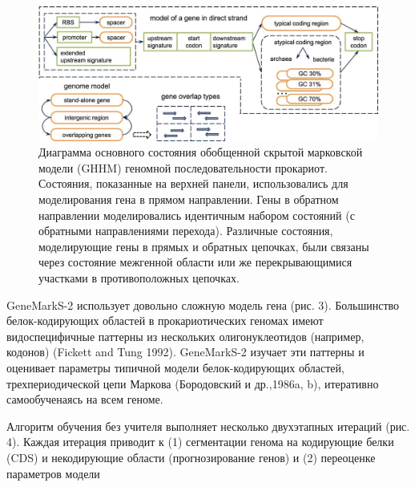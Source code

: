 \documentclass[14pt]{extarticle}
\begin{document}
    \begin{figure}[]
            \centering
            \includegraphics[width=\textwidth]{img/gms2_1.jpg}
            \caption{Диаграмма основного состояния обобщенной скрытой марковской модели (GHHM) геномной 
            последовательности прокариот. Состояния, показанные на верхней панели, использовались для моделирования гена
            в прямом направлении. Гены в обратном направлении моделировались идентичным набором состояний (с обратными 
            направлениями перехода). Различные состояния, моделирующие гены в прямых и обратных цепочках, были связаны 
            через состояние межгенной области или же перекрывающимися участками в противоположных цепочках. 
            \cite{lomsad}}
            \label{fig:skybox}
    \end{figure}
    
    \par{GeneMarkS-2 использует довольно сложную модель гена (рис. 3). Большинство белок-кодирующих областей в 
    прокариотических геномах имеют видоспецифичные паттерны из нескольких олигонуклеотидов (например, кодонов) (Fickett 
    and Tung 1992). GeneMarkS-2 изучает эти паттерны и оценивает параметры типичной модели белок-кодирующих областей, 
    трехпериодической цепи Маркова (Бородовский и др.,1986a, b), итеративно самообученаясь на всем геноме.}
    
    
    \par{Алгоритм обучения без учителя выполняет несколько двухэтапных итераций (рис. 4). Каждая итерация приводит к (1)
    сегментации генома на кодирующие белки (CDS) и некодирующие области (прогнозирование генов) и (2) переоценке 
    параметров модели}
    
\end{document}
